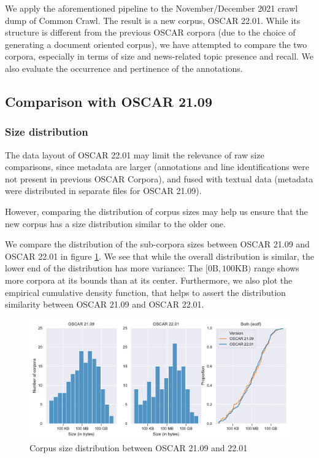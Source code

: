 We apply the aforementioned pipeline to the November/December 2021 crawl dump of Common Crawl. The result is a new corpus, OSCAR 22.01. While its structure is different from the previous OSCAR corpora (due to the choice of generating a document oriented corpus), we have attempted to compare the two corpora, especially in terms of size and news-related topic presence and recall. We also evaluate the occurrence and pertinence of the annotations.

\subsection{Comparison with OSCAR 21.09}
\subsubsection{Size distribution}

The data layout of OSCAR 22.01 may limit the relevance of raw size comparisons, since metadata are larger (annotations and line identifications were not present in previous OSCAR Corpora), and fused with textual data (metadata were distributed in separate files for OSCAR 21.09).

However, comparing the distribution of corpus sizes may help us ensure that the new corpus has a size distribution similar to the older one.

We compare the distribution of the sub-corpora sizes between OSCAR 21.09 and OSCAR 22.01 in figure \ref{fig.1}. We see that while the overall distribution is similar, the lower end of the distribution has more variance: The $[0\text{B}, 100\text{KB})$ range shows more corpora at its bounds than at its center. Furthermore, we also plot the empirical cumulative density function, that helps to assert the distribution similarity between OSCAR 21.09 and OSCAR 22.01.

\begin{figure}[!ht]
    \begin{center}
        \includegraphics[width=\linewidth]{static/media/oscar/towards/size-comp}
        \caption{Corpus size distribution between OSCAR 21.09 and 22.01}
        \label{fig.1}
    \end{center}
\end{figure}

